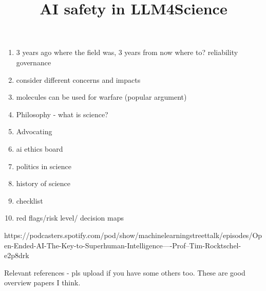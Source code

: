 \documentclass{article}
\title{AI safety in LLM4Science}
\begin{document}
\maketitle







\begin{enumerate}
    \item 3 years ago where the field was, 3 years from now where to? reliability governance
    \item consider different concerns and impacts
    \item molecules can be used for warfare (popular argument) 
    \item Philosophy - what is science?
    \item Advocating
    \item ai ethics board
    \item politics in science
    \item history of science
    \item checklist 
    \item red flags/risk level/ decision maps
    
\end{enumerate}

https://podcasters.spotify.com/pod/show/machinelearningstreettalk/episodes/Open-Ended-AI-The-Key-to-Superhuman-Intelligence----Prof--Tim-Rocktschel-e2p8drk


Relevant references - pls upload if you have some others too. These are good overview papers I think.
\end{document}
